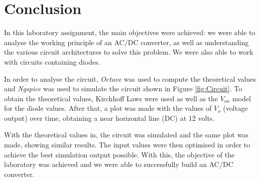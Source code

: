 \section{Conclusion}
\label{sec:conclusion}

\indent

In this laboratory assignment, the main objectives were achieved: we were able to analyse the working principle of an AC/DC converter, as well as understanding the various circuit architectures to solve this problem. We were also able to work with circuits containing diodes. 

In order to analyse the circuit, \textit{Octave} was used to compute the theoretical values and \textit{Ngspice} was used to simulate the circuit shown in Figure \ref{fig:Circuit}. To obtain the theoretical values, Kirchhoff Laws were used as well as the $V_{on}$ model for the diode values.
After that, a plot was made with the values of $V_o$ (voltage output) over time, obtaining a near horizontal line (DC) at 12 volts. 

With the theoretical values in, the circuit was simulated and the same plot was made, showing similar results. The input values were then optimised in order to achieve the best simulation output possible. With this, the objective of the laboratory was achieved and we were able to successfully build an AC/DC converter.
